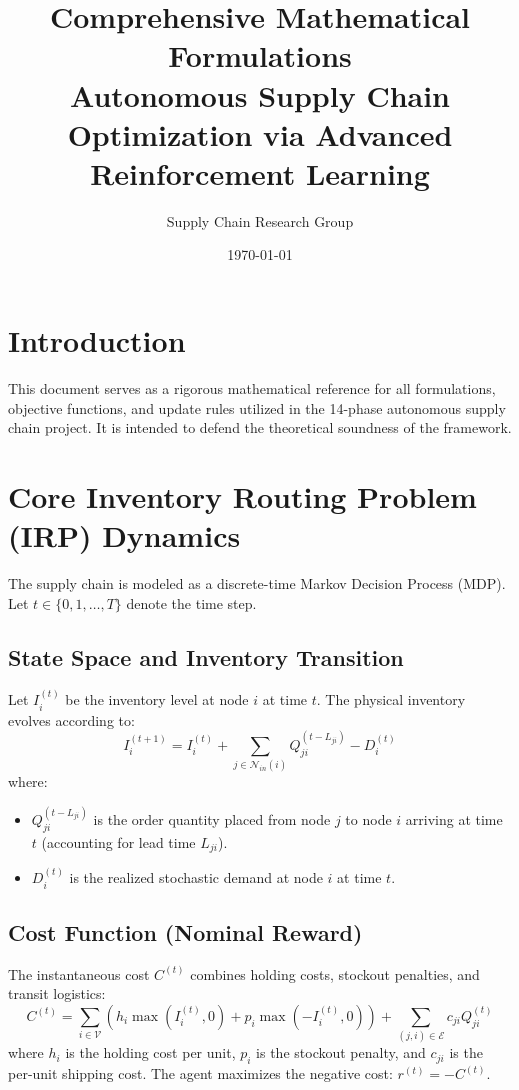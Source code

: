 \documentclass[11pt,a4paper]{article}
\title{\textbf{Comprehensive Mathematical Formulations}\\
\large Autonomous Supply Chain Optimization via Advanced Reinforcement Learning}
\author{Supply Chain Research Group}
\date{\today}
\begin{document}
\maketitle

\section{Introduction}
This document serves as a rigorous mathematical reference for all formulations, objective functions, and update rules utilized in the 14-phase autonomous supply chain project. It is intended to defend the theoretical soundness of the framework.

\section{Core Inventory Routing Problem (IRP) Dynamics}
The supply chain is modeled as a discrete-time Markov Decision Process (MDP). Let $t \in \{0, 1, \dots, T\}$ denote the time step.

\subsection{State Space and Inventory Transition}
Let $I_i^{(t)}$ be the inventory level at node $i$ at time $t$. The physical inventory evolves according to:
\begin{equation}
    I_i^{(t+1)} = I_i^{(t)} + \sum_{j \in \mathcal{N}_{in}(i)} Q_{ji}^{(t - L_{ji})} - D_i^{(t)}
\end{equation}
where:
\begin{itemize}
    \item $Q_{ji}^{(t - L_{ji})}$ is the order quantity placed from node $j$ to node $i$ arriving at time $t$ (accounting for lead time $L_{ji}$).
    \item $D_i^{(t)}$ is the realized stochastic demand at node $i$ at time $t$.
\end{itemize}

\subsection{Cost Function (Nominal Reward)}
The instantaneous cost $C^{(t)}$ combines holding costs, stockout penalties, and transit logistics:
\begin{equation}
    C^{(t)} = \sum_{i \in \mathcal{V}} \left( h_i \max(I_i^{(t)}, 0) + p_i \max(-I_i^{(t)}, 0) \right) + \sum_{(j,i) \in \mathcal{E}} c_{ji} Q_{ji}^{(t)}
\end{equation}
where $h_i$ is the holding cost per unit, $p_i$ is the stockout penalty, and $c_{ji}$ is the per-unit shipping cost. The agent maximizes the negative cost: $r^{(t)} = -C^{(t)}$.
\end{document}
